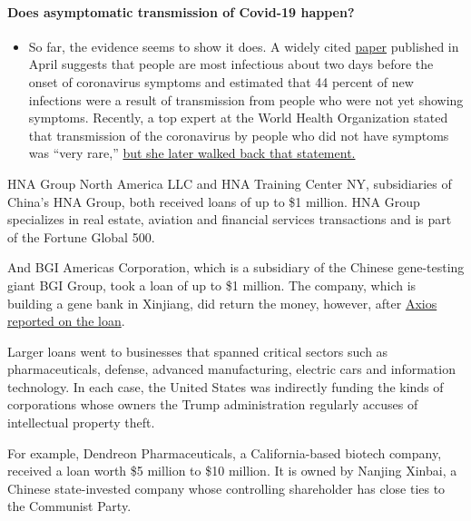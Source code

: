\begin{itemize}
{  \paragraph{Does asymptomatic transmission of Covid-19
  happen?}\label{does-asymptomatic-transmission-of-covid-19-happen}}

  \begin{itemize}
  \tightlist
  \item
    So far, the evidence seems to show it does. A widely cited
    \href{https://www.nature.com/articles/s41591-020-0869-5}{paper}
    published in April suggests that people are most infectious about
    two days before the onset of coronavirus symptoms and estimated that
    44 percent of new infections were a result of transmission from
    people who were not yet showing symptoms. Recently, a top expert at
    the World Health Organization stated that transmission of the
    coronavirus by people who did not have symptoms was ``very rare,''
    \href{https://www.nytimes.com/2020/06/09/world/coronavirus-updates.html?action=click\&pgtype=Article\&state=default\&region=MAIN_CONTENT_3\&context=storylines_faq\#link-1f302e21}{but
    she later walked back that statement.}
  \end{itemize}
\end{itemize}

HNA Group North America LLC and HNA Training Center NY, subsidiaries of
China's HNA Group, both received loans of up to \$1 million. HNA Group
specializes in real estate, aviation and financial services transactions
and is part of the Fortune Global 500.

And BGI Americas Corporation, which is a subsidiary of the Chinese
gene-testing giant BGI Group, took a loan of up to \$1 million. The
company, which is building a gene bank in Xinjiang, did return the
money, however, after
\href{https://www.axios.com/chinese-biotech-us-subsidiary-ppp-loan-8134a863-3779-46c4-9190-ceca54ba00ca.html}{Axios
reported on the loan}.

Larger loans went to businesses that spanned critical sectors such as
pharmaceuticals, defense, advanced manufacturing, electric cars and
information technology. In each case, the United States was indirectly
funding the kinds of corporations whose owners the Trump administration
regularly accuses of intellectual property theft.

For example, Dendreon Pharmaceuticals, a California-based biotech
company, received a loan worth \$5 million to \$10 million. It is owned
by Nanjing Xinbai, a Chinese state-invested company whose controlling
shareholder has close ties to the Communist Party.

